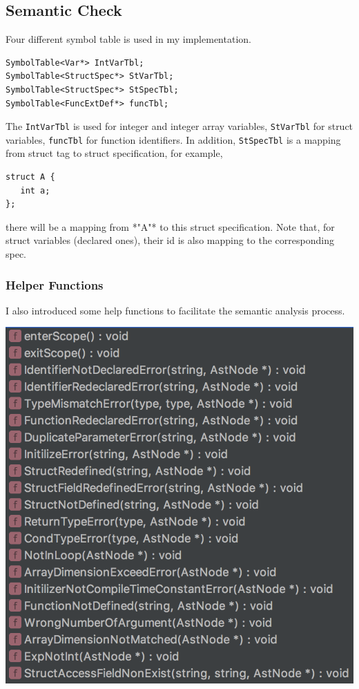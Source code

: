 \documentclass[11pt]{article}
\begin{document}
\subsection{Semantic Check}
\label{sec:orgheadline12}
Four different symbol table is used in my implementation.
\begin{verbatim}
SymbolTable<Var*> IntVarTbl;
SymbolTable<StructSpec*> StVarTbl;
SymbolTable<StructSpec*> StSpecTbl;
SymbolTable<FuncExtDef*> funcTbl;
\end{verbatim}
The \texttt{IntVarTbl} is used for integer and integer array variables, \texttt{StVarTbl}
for struct variables, \texttt{funcTbl} for function identifiers. In addition,
\texttt{StSpecTbl} is a mapping from struct tag to struct specification, for
example,
\begin{verbatim}
struct A {
   int a;
};
\end{verbatim}
there will be a mapping from *"A"* to this struct specification. Note that, for
struct variables (declared ones), their id is also mapping to the corresponding
spec.

\subsubsection{Helper Functions}
\label{sec:orgheadline10}
I also introduced some help functions to facilitate the semantic analysis
process.

\includegraphics[width=.9\linewidth]{img/error.png}
\end{document}
